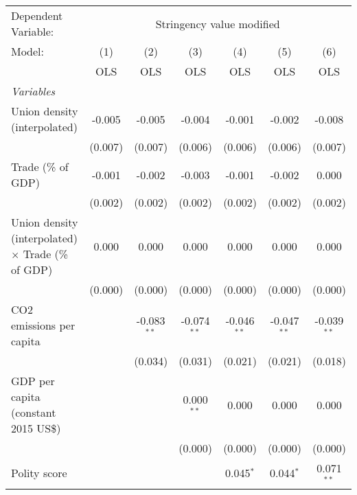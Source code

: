 
\begingroup
\centering
\begin{tabular}{lcccccc}
   \toprule
   Dependent Variable: & \multicolumn{6}{c}{Stringency value modified}\\
   Model:                                                    & (1)     & (2)           & (3)           & (4)           & (5)           & (6)\\  
                                                             &  OLS    & OLS           & OLS           & OLS           & OLS           & OLS\\  
   \midrule
   \emph{Variables}\\
   Union density (interpolated)                              & -0.005  & -0.005        & -0.004        & -0.001        & -0.002        & -0.008\\   
                                                             & (0.007) & (0.007)       & (0.006)       & (0.006)       & (0.006)       & (0.007)\\   
   Trade (\% of GDP)                                         & -0.001  & -0.002        & -0.003        & -0.001        & -0.002        & 0.000\\   
                                                             & (0.002) & (0.002)       & (0.002)       & (0.002)       & (0.002)       & (0.002)\\   
   Union density (interpolated) $\times$ Trade (\% of GDP)   & 0.000   & 0.000         & 0.000         & 0.000         & 0.000         & 0.000\\   
                                                             & (0.000) & (0.000)       & (0.000)       & (0.000)       & (0.000)       & (0.000)\\   
   CO2 emissions per capita                                  &         & -0.083$^{**}$ & -0.074$^{**}$ & -0.046$^{**}$ & -0.047$^{**}$ & -0.039$^{**}$\\   
                                                             &         & (0.034)       & (0.031)       & (0.021)       & (0.021)       & (0.018)\\   
   GDP per capita (constant 2015 US\$)                       &         &               & 0.000$^{**}$  & 0.000         & 0.000         & 0.000\\   
                                                             &         &               & (0.000)       & (0.000)       & (0.000)       & (0.000)\\   
   Polity score                                              &         &               &               & 0.045$^{*}$   & 0.044$^{*}$   & 0.071$^{**}$\\   

\end{tabular}
